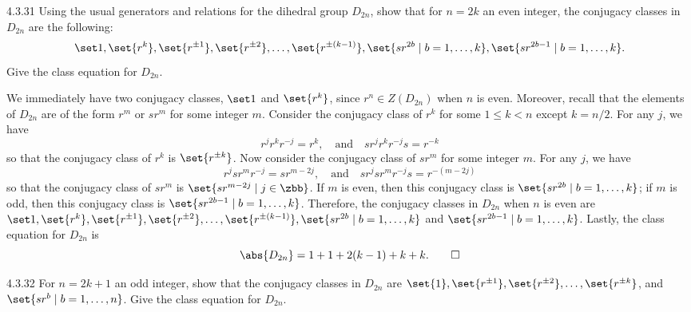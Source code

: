 \begin{exercise}{4.3.31}
	Using the usual generators and relations for the dihedral group $D_{2n}$, show that for $n = 2k$ an even integer, the conjugacy classes in $D_{2n}$ are the following:
	\[
		\set 1, \set{r^k}, \set{r^{\pm 1}}, \set{r^{\pm 2}}, \ldots, \set{r^{\pm(k - 1)}}, \set{sr^{2b} \mid b = 1, \ldots, k}, \set{sr^{2b - 1} \mid b = 1, \ldots, k}.
	\]
	Give the class equation for $D_{2n}$.
\end{exercise}

\begin{sol}
	We immediately have two conjugacy classes, $\set 1$ and $\set{r^k}$, since $r^n \in Z(D_{2n})$ when $n$ is even.
	Moreover, recall that the elements of $D_{2n}$ are of the form $r^m$ or $sr^m$ for some integer $m$.
	Consider the conjugacy class of $r^k$ for some $1 \leq k < n$ except $k = n/2$.
	For any $j$, we have
	\[
		r^jr^kr^{-j} = r^k, \quad \text{and} \quad sr^jr^kr^{-j}s = r^{-k}
	\]
	so that the conjugacy class of $r^k$ is $\set{r^{\pm k}}$.
	Now consider the conjugacy class of $sr^m$ for some integer $m$.
	For any $j$, we have
	\[
		r^jsr^mr^{-j} = sr^{m - 2j}, \quad \text{and} \quad sr^jsr^mr^{-j}s = r^{-(m - 2j)}
	\]
	so that the conjugacy class of $sr^m$ is $\set{sr^{m - 2j} \mid j \in \zbb}$.
	If $m$ is even, then this conjugacy class is $\set{sr^{2b} \mid b = 1, \ldots, k}$; if $m$ is odd, then this conjugacy class is $\set{sr^{2b - 1} \mid b = 1, \ldots, k}$.
	Therefore, the conjugacy classes in $D_{2n}$ when $n$ is even are $\set 1, \set{r^k}, \set{r^{\pm 1}}, \set{r^{\pm 2}}, \ldots, \set{r^{\pm(k - 1)}}, \set{sr^{2b} \mid b = 1, \ldots, k}$ and $\set{sr^{2b - 1} \mid b = 1, \ldots, k}$.
	Lastly, the class equation for $D_{2n}$ is
	\[
		\abs{D_{2n}} = 1 + 1 + 2(k - 1) + k + k.\qedhere
	\]
\end{sol}

\begin{exercise}{4.3.32}
	For $n = 2k + 1$ an odd integer, show that the conjugacy classes in $D_{2n}$ are $\set{1}, \set{r^{\pm 1}}, \set{r^{\pm 2}}, \ldots, \set{r^{\pm k}}$, and $\set{sr^b \mid b = 1, \ldots, n}$.
	Give the class equation for $D_{2n}$.
\end{exercise}

